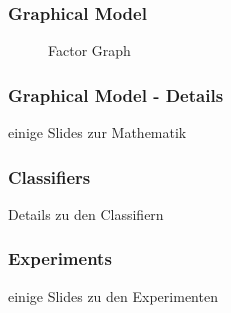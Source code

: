 \begin{frame}
    \frametitle{Graphical Model}
    \begin{figure}
        \centering
        \newcommand{\distancebetweenlayers}{90}
        \newcommand{\scalingfactor}{0.3}
        \scalebox{0.9}{
            \begin{tikzpicture}
                
            \end{tikzpicture}
        }
        \caption{Factor Graph}
        \label{fig:joint-fg}
    \end{figure}
\end{frame}

\begin{frame}
    \frametitle{Graphical Model - Details}
    einige Slides zur Mathematik
\end{frame}

\begin{frame}
    \frametitle{Classifiers}
    Details zu den Classifiern
\end{frame}

\begin{frame}
    \frametitle{Experiments}
    einige Slides zu den Experimenten
\end{frame}


